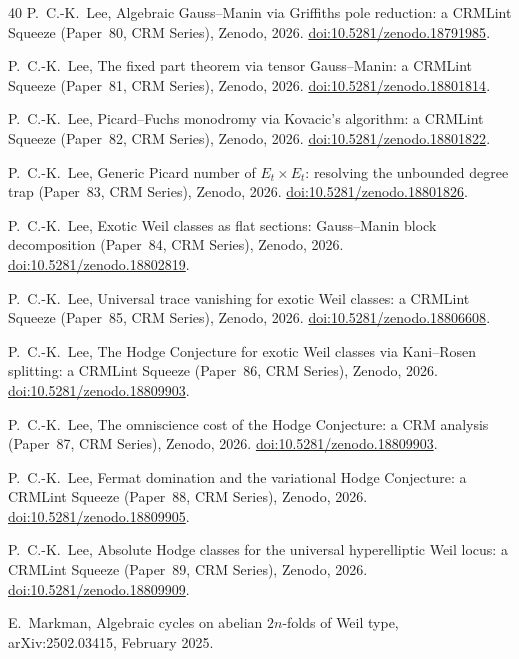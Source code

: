 \documentclass[11pt]{article}
\theoremstyle{plain}
\theoremstyle{definition}
\theoremstyle{remark}
\begin{document}
\begin{thebibliography}{40}
P.~C.-K.\ Lee,
Algebraic Gauss--Manin via Griffiths pole reduction: a CRMLint Squeeze
(Paper~80, CRM Series),
Zenodo, 2026.
\href{https://doi.org/10.5281/zenodo.18791985}{doi:10.5281/zenodo.18791985}.

P.~C.-K.\ Lee,
The fixed part theorem via tensor Gauss--Manin: a CRMLint Squeeze
(Paper~81, CRM Series),
Zenodo, 2026.
\href{https://doi.org/10.5281/zenodo.18801814}{doi:10.5281/zenodo.18801814}.

P.~C.-K.\ Lee,
Picard--Fuchs monodromy via Kovacic's algorithm: a CRMLint Squeeze
(Paper~82, CRM Series),
Zenodo, 2026.
\href{https://doi.org/10.5281/zenodo.18801822}{doi:10.5281/zenodo.18801822}.

P.~C.-K.\ Lee,
Generic Picard number of $E_t \times E_t$: resolving the
unbounded degree trap (Paper~83, CRM Series),
Zenodo, 2026.
\href{https://doi.org/10.5281/zenodo.18801826}{doi:10.5281/zenodo.18801826}.

P.~C.-K.\ Lee,
Exotic Weil classes as flat sections: Gauss--Manin block decomposition
(Paper~84, CRM Series),
Zenodo, 2026.
\href{https://doi.org/10.5281/zenodo.18802819}{doi:10.5281/zenodo.18802819}.

P.~C.-K.\ Lee,
Universal trace vanishing for exotic Weil classes: a CRMLint Squeeze
(Paper~85, CRM Series),
Zenodo, 2026.
\href{https://doi.org/10.5281/zenodo.18806608}{doi:10.5281/zenodo.18806608}.

P.~C.-K.\ Lee,
The Hodge Conjecture for exotic Weil classes via Kani--Rosen splitting:
a CRMLint Squeeze (Paper~86, CRM Series),
Zenodo, 2026.
\href{https://doi.org/10.5281/zenodo.18809903}{doi:10.5281/zenodo.18809903}.

P.~C.-K.\ Lee,
The omniscience cost of the Hodge Conjecture: a CRM analysis
(Paper~87, CRM Series),
Zenodo, 2026.
\href{https://doi.org/10.5281/zenodo.18809903}{doi:10.5281/zenodo.18809903}.

P.~C.-K.\ Lee,
Fermat domination and the variational Hodge Conjecture: a CRMLint Squeeze
(Paper~88, CRM Series),
Zenodo, 2026.
\href{https://doi.org/10.5281/zenodo.18809905}{doi:10.5281/zenodo.18809905}.

P.~C.-K.\ Lee,
Absolute Hodge classes for the universal hyperelliptic Weil locus:
a CRMLint Squeeze (Paper~89, CRM Series),
Zenodo, 2026.
\href{https://doi.org/10.5281/zenodo.18809909}{doi:10.5281/zenodo.18809909}.

E.~Markman,
Algebraic cycles on abelian $2n$-folds of Weil type,
arXiv:2502.03415, February 2025.


\end{thebibliography}
\end{document}
